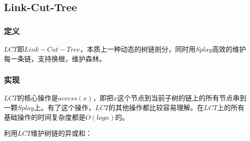 \documentclass[11pt]{article}
\begin{document}
\subsection{Link-Cut-Tree}
\label{sec:org4b11908}
\subsubsection{定义}
\label{sec:org54f6533}

\(LCT\)即\(Link-Cut-Tree\)，本质上一种动态的树链剖分，同时用\(Splay\)高效的维护每一条链，支持换根，维护森林。

\subsubsection{实现}
\label{sec:orgaabf04e}

\(LCT\)的核心操作是\(access(x)\)，即把\(x\)这个节点到当前子树的链上的所有节点串到一颗\(Splay\)上。有了这个操作，\(LCT\)的其他操作都比较容易理解。在\(LCT\)上的所有基础操作的时间复杂度都是\(O(logn)\)的。

利用\(LCT\)维护树链的异或和：
\end{document}
